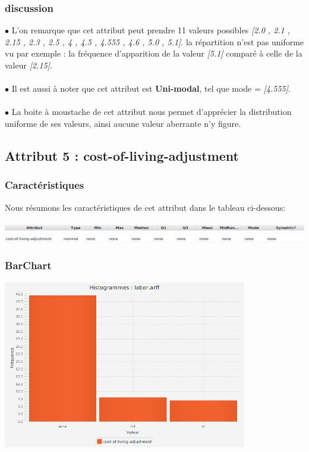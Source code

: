 \documentclass[12pt,a4paper,oneside]{book}
\begin{document}
\subsubsection{discussion}
$\bullet $ L'on remarque que cet attribut peut prendre 11 valeurs possibles \textit{[2.0 , 2.1 , 2.15 , 2.3 , 2.5 , 4 , 4.5 , 4.555 , 4.6 , 5.0 , 5.1]}. la répartition n'est pas uniforme vu par exemple : la fréquence d'apparition de la valeur \textit{[5.1]} comparé à celle de la valeur \textit{[2.15]}.\\
\textbf{ }\\
$\bullet $ Il est aussi à noter que cet attribut est \textbf{Uni-modal}, tel que mode = \textit{[4.555]}.\\
\textbf{ }\\
$\bullet $ La boite à moustache de cet attribut nous permet d'apprécier la distribution uniforme de ses valeurs, ainsi aucune valeur aberrante n'y
figure.


\newpage

\subsection{Attribut 5 : cost-of-living-adjustment }
\subsubsection{Caractéristiques}
Nous résumons les caractéristiques de cet attribut dans le tableau ci-dessous:
\begin{center}
	\includegraphics[width=1\textwidth]{screens/att.png}\\ \includegraphics[width=1\textwidth]{screens/att-5.png}%
	\label{labelname}%
\end{center}

\subsubsection{BarChart}
\begin{center}
	\includegraphics[width=0.8\textwidth]{screens/barchart/cost-of-living-adjustment-barchart.png}%
	\label{labelname}%
\end{center}
\end{document}
